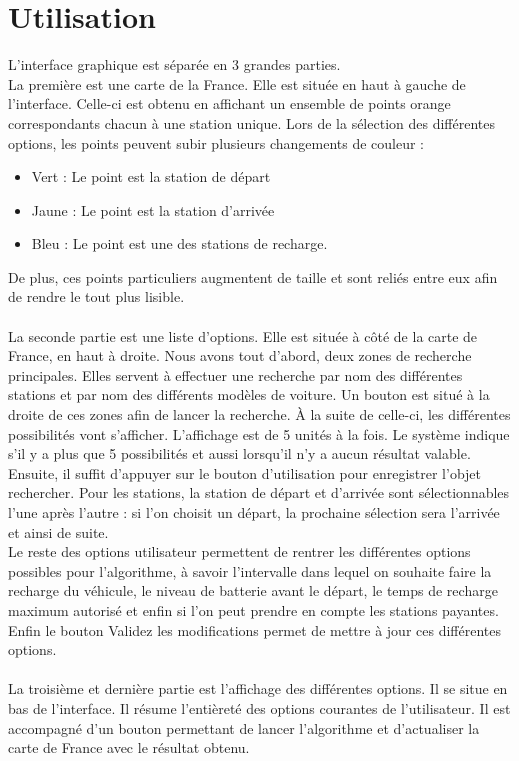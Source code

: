 \documentclass[12pt,titlepage]{report}
\begin{document}
\section{Utilisation}

 L’interface graphique est séparée en 3 grandes parties.
 \\
 La première est une carte de la France. Elle est située en haut à gauche de l’interface. Celle-ci est obtenu en affichant un ensemble de points orange correspondants chacun à une station unique. Lors de la sélection des différentes options, les points peuvent subir plusieurs changements de couleur : 
\begin{itemize}
    \item Vert : Le point est la station de départ
    \item Jaune : Le point est la station d’arrivée
    \item Bleu : Le point est une des stations de recharge.
\end{itemize}
	
De plus, ces points particuliers augmentent de taille et sont reliés entre eux afin de rendre le tout plus lisible.
\\ \\
La seconde partie est une liste d’options. Elle est située à côté de la carte de France, en haut à droite. Nous avons tout d’abord, deux zones de recherche principales. Elles servent à effectuer une recherche par nom des différentes stations et par nom des différents modèles de voiture. Un bouton est situé à la droite de ces zones afin de lancer la recherche. À la suite de celle-ci, les différentes possibilités vont s’afficher. L’affichage est de 5 unités à la fois. Le système indique s’il y a plus que 5 possibilités et aussi lorsqu’il n’y a aucun résultat valable. Ensuite, il suffit d’appuyer sur le bouton d’utilisation pour enregistrer l’objet rechercher. Pour les stations, la station de départ et d’arrivée sont sélectionnables l’une après l’autre : si l’on choisit un départ, la prochaine sélection sera l’arrivée et ainsi de suite.
\\
Le reste des options utilisateur permettent de rentrer les différentes options possibles pour l’algorithme, à savoir l’intervalle dans lequel on souhaite faire la recharge du véhicule, le niveau de batterie avant le départ, le temps de recharge maximum autorisé et enfin si l’on peut prendre en compte les stations payantes. 
Enfin le bouton Validez les modifications permet de mettre à jour ces différentes options.
\\ \\
La troisième et dernière partie est l’affichage des différentes options. Il se situe en bas de l’interface. Il résume l’entièreté des options courantes de l’utilisateur. Il est accompagné d’un bouton permettant de lancer l’algorithme et d’actualiser la carte de France avec le résultat obtenu.
\end{document}
